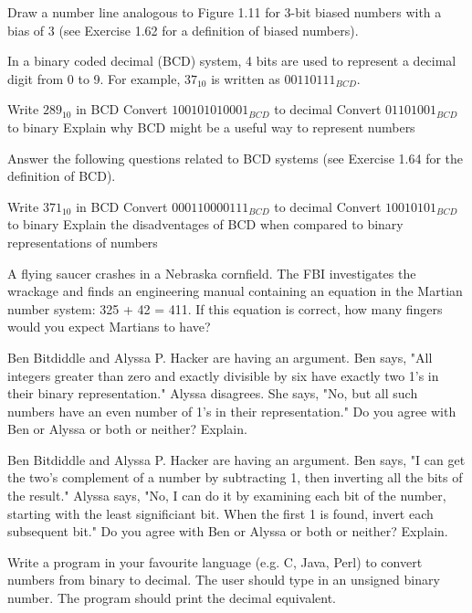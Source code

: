 \exercise %
Draw a number line analogous to Figure 1.11 for 3-bit biased numbers with a bias of 3 (see Exercise
1.62 for a definition of biased numbers).

\exercise %
In a binary coded decimal (BCD) system, 4 bits are used to represent a decimal digit from 0 to 9.
For example, $37_10$ is written as $00110111_{BCD}$.
\begin{tasks}
	\task Write $289_{10}$ in BCD
	\task Convert $100101010001_{BCD}$ to decimal
	\task Convert $01101001_{BCD}$ to binary
	\task Explain why BCD might be a useful way to represent numbers
\end{tasks}

\exercise %
Answer the following questions related to BCD systems (see Exercise 1.64 for the definition of BCD).
\begin{tasks}
	\task Write $371_{10}$ in BCD
	\task Convert $000110000111_{BCD}$ to decimal
	\task Convert $10010101_{BCD}$ to binary
	\task Explain the disadventages of BCD when compared to binary representations of numbers
\end{tasks}

\exercise %
A flying saucer crashes in a Nebraska cornfield. The FBI investigates the wrackage and finds an
engineering manual containing an equation in the Martian number system: 325 + 42 = 411. If this
equation is correct, how many fingers would you expect Martians to have?

\exercise %
Ben Bitdiddle and Alyssa P. Hacker are having an argument. Ben says, "All integers greater than zero
and exactly divisible by six have exactly two 1's in their binary representation." Alyssa disagrees.
She says, "No, but all such numbers have an even number of 1's in their representation." Do you agree
with Ben or Alyssa or both or neither? Explain.

\exercise %
Ben Bitdiddle and Alyssa P. Hacker are having an argument. Ben says, "I can get the two's complement
of a number by subtracting 1, then inverting all the bits of the result." Alyssa says, "No, I can do
it by examining each bit of the number, starting with the least significiant bit. When the first 1 is
found, invert each subsequent bit." Do you agree with Ben or Alyssa or both or neither? Explain.

\exercise %
Write a program in your favourite language (e.g. C, Java, Perl) to convert numbers from binary to
decimal. The user should type in an unsigned binary number. The program should print the decimal
equivalent.

